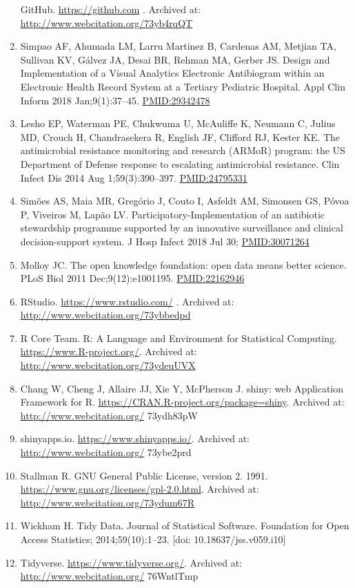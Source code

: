 \documentclass[
]{book}
\begin{document}
\begin{enumerate}
  GitHub. \url{https://github.com} . Archived at: \url{http://www.webcitation.org/73yb4rqQT}
\item
  Simpao AF, Ahumada LM, Larru Martinez B, Cardenas AM, Metjian TA, Sullivan KV, Gálvez JA, Desai BR, Rehman MA, Gerber JS. Design and Implementation of a Visual Analytics Electronic Antibiogram within an Electronic Health Record System at a Tertiary Pediatric Hospital. Appl Clin Inform 2018 Jan;9(1):37--45. \url{PMID:29342478}
\item
  Lesho EP, Waterman PE, Chukwuma U, McAuliffe K, Neumann C, Julius MD, Crouch H, Chandrasekera R, English JF, Clifford RJ, Kester KE. The antimicrobial resistance monitoring and research (ARMoR) program: the US Department of Defense response to escalating antimicrobial resistance. Clin Infect Dis 2014 Aug 1;59(3):390--397. \url{PMID:24795331}
\item
  Simões AS, Maia MR, Gregório J, Couto I, Asfeldt AM, Simonsen GS, Póvoa P, Viveiros M, Lapão LV. Participatory-Implementation of an antibiotic stewardship programme supported by an innovative surveillance and clinical decision-support system. J Hosp Infect 2018 Jul 30; \url{PMID:30071264}
\item
  Molloy JC. The open knowledge foundation: open data means better science. PLoS Biol 2011 Dec;9(12):e1001195. \url{PMID:22162946}
\item
  RStudio. \url{https://www.rstudio.com/} . Archived at: \url{http://www.webcitation.org/73ybbedpd}
\item
  R Core Team. R: A Language and Environment for Statistical Computing. \url{https://www.R-project.org/}. Archived at: \url{http://www.webcitation.org/73ydeuUVX}
\item
  Chang W, Cheng J, Allaire JJ, Xie Y, McPherson J. shiny: web Application Framework for R. \url{https://CRAN.R-project.org/package=shiny}. Archived at: \url{http://www.webcitation.org/} 73ydh83pW
\item
  shinyapps.io. \url{https://www.shinyapps.io/}. Archived at: \url{http://www.webcitation.org/} 73ybe2prd
\item
  Stallman R. GNU General Public License, version 2. 1991. \url{https://www.gnu.org/licenses/gpl-2.0.html}. Archived at: \url{http://www.webcitation.org/73ydum67R}
\item
  Wickham H. Tidy Data. Journal of Statistical Software. Foundation for Open Access Statistics; 2014;59(10):1--23. {[}doi: 10.18637/jss.v059.i10{]}
\item
  Tidyverse. \url{https://www.tidyverse.org/}. Archived at: \url{http://www.webcitation.org/} 76WntlTmp

\end{enumerate}
\end{document}
